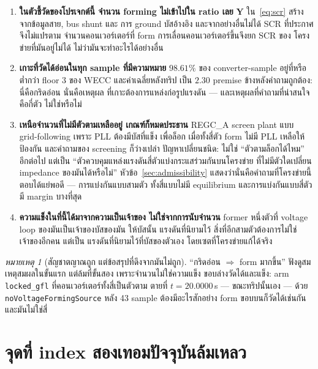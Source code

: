\documentclass[12pt,a4paper]{article}
\theoremstyle{remark}
\newtheorem{remark}{หมายเหตุ}
\newcommand{\code}[1]{\texttt{\small #1}}
\begin{document}
\begin{enumerate}[leftmargin=1.9em]
\item \textbf{ในตัวชี้วัดของโปรเจกต์นี้ จำนวน forming ไม่เข้าไปใน ratio เลย}
      $\mathbf{Y}$ ใน~\eqref{eq:scr} สร้างจากข้อมูลสาย, bus shunt และ
      การ ground บัสอ้างอิง และจากอย่างอื่นไม่ได้ SCR ที่ประกาศจึงไม่แปรตาม
      จำนวนคอนเวอร์เตอร์ที่ form การเลื่อนคอนเวอร์เตอร์ขึ้นจึงยก SCR ของ
      โครงข่ายที่มันอยู่ไม่ได้ ไม่ว่ามันจะทำอะไรได้อย่างอื่น
\item \textbf{เกาะที่วัดได้อ่อนในทุก sample ที่มีความหมาย} $98.61\%$ ของ
      converter-sample อยู่ที่หรือต่ำกว่า floor 3 ของ WECC และค่าเฉลี่ยหลังทริป
      เป็น $2.30$ premise ข้างหลังคำถามถูกต้อง: นี่คือกริดอ่อน นั่นคือเหตุผล
      ที่เกาะต้องการแหล่งก่อรูปแรงดัน --- และเหตุผลที่คำถามที่น่าสนใจคือกี่ตัว
      ไม่ใช่หรือไม่
\item \textbf{เหนือจำนวนที่ไม่มีตัวตามเหลืออยู่ เกณฑ์ก็หมดประธาน}
      REGC\_A screen plant แบบ grid-following เพราะ PLL ต้องมีบัสที่แข็ง
      เพื่อล็อก เมื่อทั้งสี่ตัว form ไม่มี PLL เหลือให้ป้องกัน และคำถามของ
      screening ก็ว่างเปล่า ปัญหาเปลี่ยนชนิด: ไม่ใช่ ``ตัวตามล็อกได้ไหม''
      อีกต่อไป แต่เป็น ``ตัวควบคุมแหล่งแรงดันสี่ตัวแบ่งกระแสร่วมกันบนโครงข่าย
      ที่ไม่มีตัวใดเปลี่ยน impedance ของมันได้หรือไม่'' หัวข้อ~\ref{sec:admissibility}
      แสดงว่านั่นคือคำถามที่โครงข่ายนี้ตอบได้แย่พอดี --- การแบ่งกันแบบสามตัว
      ทั้งสี่แบบไม่มี equilibrium และการแบ่งกันแบบสี่ตัวมี margin บางที่สุด
\item \textbf{ความแข็งในที่นี้ได้มาจากความเป็นเจ้าของ ไม่ใช่จากการนับจำนวน}
      former หนึ่งตัวที่ voltage loop ของมันเป็นเจ้าของบัสของมัน ให้บัสนั้น
      แรงดันที่นิยามไว้ สิ่งที่อีกสามตัวต้องการไม่ใช่เจ้าของอีกคน แต่เป็น
      แรงดันที่นิยามไว้ที่บัสของตัวเอง โดยเซตที่โครงข่ายแก้ได้จริง
\end{enumerate}

\begin{remark}[สัญชาตญาณถูก แต่ข้อสรุปที่ดึงจากมันไม่ถูก]
``กริดอ่อน $\Rightarrow$ form มากขึ้น'' ฟังดูสมเหตุสมผลในขั้นแรก แต่ล้มที่ขั้นสอง
เพราะจำนวนไม่ใช่ความแข็ง ขอบล่างวัดได้และแข็ง: arm \code{locked\_gfl}
ที่คอนเวอร์เตอร์ทั้งสี่เป็นตัวตาม ตายที่ $t = 20.0000$\,s ---
ขณะทริปนั้นเอง --- ด้วย \code{noVoltageFormingSource} หลัง 43 sample
ต้องมีอะไรสักอย่าง form ขอบบนก็วัดได้เช่นกัน และมันไม่ใช่สี่
\end{remark}

\section{จุดที่ index สองเทอมปัจจุบันล้มเหลว}\label{sec:indices}
\end{document}
